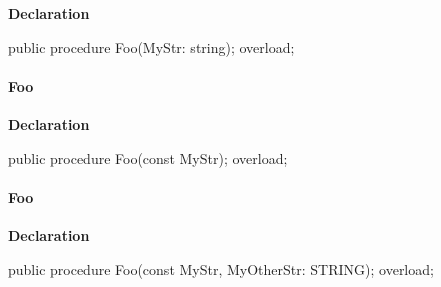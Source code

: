\documentclass{report}
\newif\ifpdf
\begin{document}
\label{ok_link_tag_overloads.TOverloadedMethods-Foo}
\begin{list}{}{
\setlength{\itemindent}{0cm}
\setlength{\listparindent}{0cm}
\setlength{\leftmargin}{\evensidemargin}
\addtolength{\leftmargin}{\tmplength}
\settowidth{\labelsep}{X}
\addtolength{\leftmargin}{\labelsep}
\setlength{\labelwidth}{\tmplength}
}
\item[\textbf{Declaration}\hfill]
\ifpdf
\begin{flushleft}
\fi
\begin{ttfamily}
public procedure Foo(MyStr: string); overload;\end{ttfamily}

\ifpdf
\end{flushleft}
\fi

\end{list}
\paragraph*{Foo}\hspace*{\fill}

\label{ok_link_tag_overloads.TOverloadedMethods-Foo}
\begin{list}{}{
\setlength{\itemindent}{0cm}
\setlength{\listparindent}{0cm}
\setlength{\leftmargin}{\evensidemargin}
\addtolength{\leftmargin}{\tmplength}
\settowidth{\labelsep}{X}
\addtolength{\leftmargin}{\labelsep}
\setlength{\labelwidth}{\tmplength}
}
\item[\textbf{Declaration}\hfill]
\ifpdf
\begin{flushleft}
\fi
\begin{ttfamily}
public procedure Foo(const MyStr); overload;\end{ttfamily}

\ifpdf
\end{flushleft}
\fi

\end{list}
\paragraph*{Foo}\hspace*{\fill}

\label{ok_link_tag_overloads.TOverloadedMethods-Foo}
\begin{list}{}{
\setlength{\itemindent}{0cm}
\setlength{\listparindent}{0cm}
\setlength{\leftmargin}{\evensidemargin}
\addtolength{\leftmargin}{\tmplength}
\settowidth{\labelsep}{X}
\addtolength{\leftmargin}{\labelsep}
\setlength{\labelwidth}{\tmplength}
}
\item[\textbf{Declaration}\hfill]
\ifpdf
\begin{flushleft}
\fi
\begin{ttfamily}
public procedure Foo(const MyStr, MyOtherStr: STRING); overload;\end{ttfamily}

\ifpdf
\end{flushleft}
\fi

\end{list}
\end{document}
